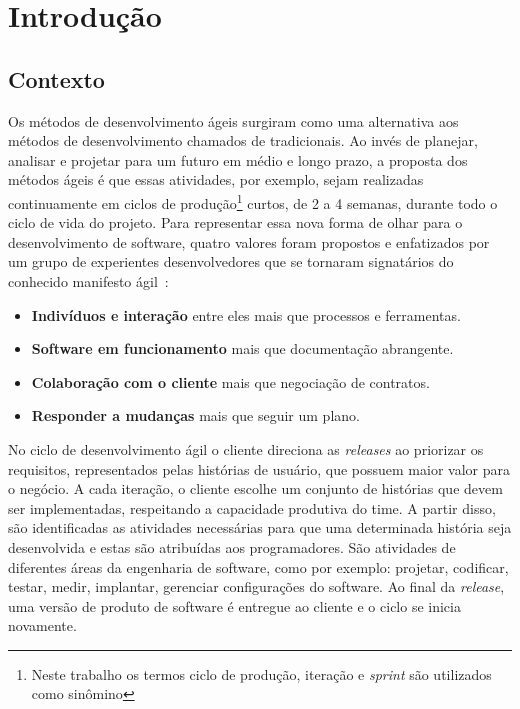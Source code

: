 \chapter{Introdução}
\label{int}
\section{Contexto}
\label{int:con}

Os métodos de desenvolvimento ágeis surgiram como uma alternativa aos métodos de desenvolvimento chamados de tradicionais. Ao invés de planejar, analisar e projetar para um futuro em médio e longo prazo, a proposta dos métodos ágeis é que essas atividades, por exemplo, sejam realizadas continuamente em ciclos de produção\footnote{Neste trabalho os termos ciclo de produção, iteração e \textit{sprint} são utilizados como sinômino} curtos, de 2 a 4 semanas, durante todo o ciclo de vida do projeto.
Para representar essa nova forma de olhar para o desenvolvimento de software, quatro valores foram propostos e enfatizados por um grupo de experientes desenvolvedores que se tornaram signatários do conhecido manifesto ágil~\cite{beckManifesto}:


\begin{itemize}
    \item \textbf{Indivíduos e interação} entre eles mais que processos e ferramentas.
    \item \textbf{Software em funcionamento} mais que documentação abrangente.
    \item \textbf{Colaboração com o cliente} mais que negociação de contratos.
    \item \textbf{Responder a mudanças} mais que seguir um plano.
\end{itemize}

No ciclo de desenvolvimento ágil o cliente direciona as \textit{releases} ao priorizar os requisitos, representados pelas histórias de usuário, que possuem maior valor para o negócio. A cada iteração, o cliente escolhe um conjunto de  histórias que devem ser implementadas, respeitando a capacidade produtiva do time. A partir disso, são identificadas as atividades necessárias para que uma determinada história seja desenvolvida e estas são atribuídas aos programadores. São atividades de diferentes áreas da engenharia de software, como por exemplo: projetar, codificar, testar, medir, implantar, gerenciar configurações do software. Ao final da \textit{release}, uma versão de produto de software é entregue ao cliente e o ciclo se inicia novamente.

